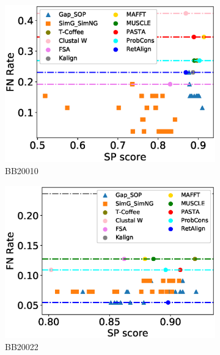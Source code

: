 \begin{figure}[!htbp]
\begin{adjustwidth}{-1.5cm}{-1cm}
\begin{subfigure}{0.22\textwidth}
			\includegraphics[width=\columnwidth]{Figure/summary/precomputedInit/Balibase/BB20010_fnrate_vs_sp_2}
			\caption{BB20010}
		\end{subfigure}
		\begin{subfigure}{0.22\textwidth}
			\includegraphics[width=\columnwidth]{Figure/summary/precomputedInit/Balibase/BB20022_fnrate_vs_sp_2}
			\caption{BB20022}
		\end{subfigure}
		\begin{subfigure}{0.22\textwidth}

\end{subfigure}
\end{adjustwidth}
\end{figure}
